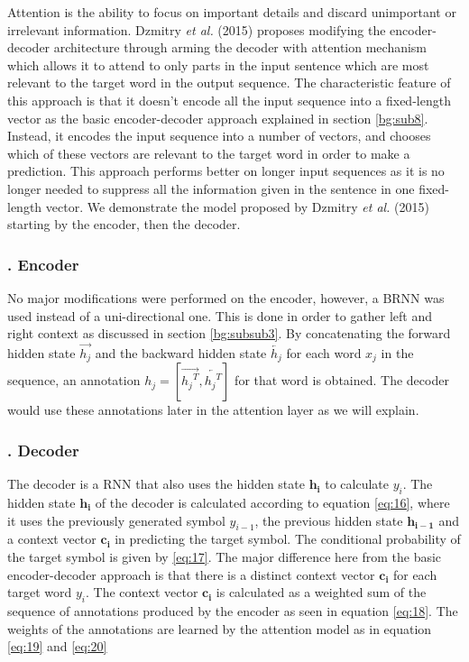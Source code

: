 Attention is the ability to focus on important details and discard unimportant or irrelevant information. Dzmitry \textit{et al.} (2015) \cite{bahdanau2014neural} proposes modifying the encoder-decoder architecture through arming the decoder with attention mechanism which allows it to attend to only parts in the input sentence which are most relevant to the target word in the output sequence. The characteristic feature of this approach is that it doesn't encode all the input sequence into a fixed-length vector as the basic encoder-decoder approach explained in section \ref{bg:sub8}. Instead, it encodes the input sequence into a number of vectors, and chooses which of these vectors are relevant to the target word in order to make a prediction. This approach performs better on longer input sequences as it is no longer needed to suppress all the information given in the sentence in one fixed-length vector. We demonstrate the model proposed by  Dzmitry \textit{et al.} (2015) \cite{bahdanau2014neural} starting by the encoder, then the decoder.

\subsubsection{. Encoder} 
\label{bg:subsub9}
No major modifications were performed on the encoder, however, a \ac{BRNN} was used instead of a uni-directional one. This is done in order to gather left and right context as discussed in section \ref{bg:subsub3}. By concatenating the forward hidden state $ {\overrightarrow{{h_j}}}$ and the backward hidden state $ {\overleftarrow{{h_j}}}$ for each word $x_j$ in the sequence, an annotation ${h_j}=[{\overrightarrow{{{h_j}^T}}}, {\overleftarrow{{{h_j}^T}}}] $ for that word is obtained. The decoder would use these annotations later in the attention layer as we will explain.

\subsubsection{. Decoder} 
\label{bg:subsub10}

The decoder is a \ac{RNN} that also uses the hidden state $ \mathbf{h_i}$ to calculate $ y_i$. The hidden state $ \mathbf{h_i}$ of the decoder is calculated according to equation \ref{eq:16}, where it uses the previously generated symbol $y_{i-1}$, the previous hidden state $\mathbf{h_{i-1}}$ and a context vector $\mathbf{c_i}$ in predicting the target symbol. The conditional probability of the target symbol is given by \ref{eq:17}. The major difference here from the basic encoder-decoder approach is that there is a distinct context vector $\mathbf{c_i}$ for each target word $ y_i$. The context vector $\mathbf{c_i}$ is calculated as a weighted sum of the sequence of annotations produced by the encoder as seen in equation \ref{eq:18}. The weights of the annotations are learned by the attention model as in equation \ref{eq:19} and \ref{eq:20}


